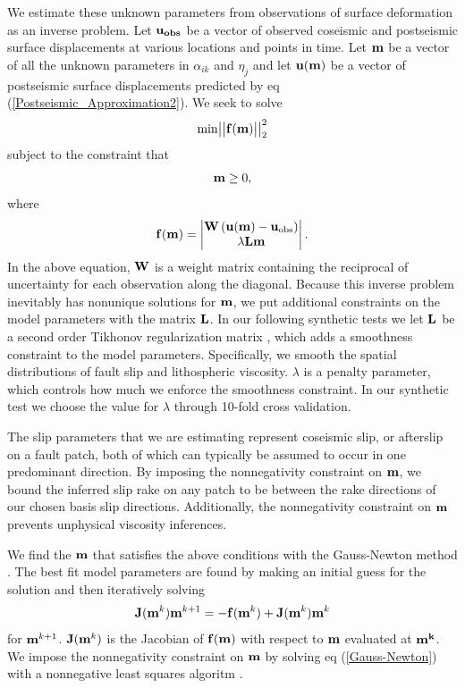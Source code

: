 \documentclass[12pt]{article}
\begin{document}
We estimate these unknown parameters from observations of surface
deformation as an inverse problem. Let $\bold{u_{obs}}$ be a vector
of observed coseismic and postseismic surface displacements at various
locations and points in time.  Let $\bold{m}$ be a vector of all the
unknown parameters in $\alpha_{ik}$ and $\eta_j$ and let $\bold{u(m)}$
be a vector of postseismic surface displacements predicted by eq
(\ref{Postseismic_Approximation2}). We seek to solve
\begin{equation}\label{Inverse_Problem}
  \mathrm{min}
  \big|\big|\bold{f(m)}\big|\big|_2^2
\end{equation}
subject to the constraint that
\begin{equation}
  \bold{m}\geq0,
\end{equation}
where 
\begin{equation}
  \bold{f(m)} = 
    \begin{vmatrix}
      \bold{W}\left(\bold{u(m)}-\bold{u}_{\mathrm{obs}}\right)\\
      \lambda\bold{Lm}\\
    \end{vmatrix} .
\end{equation}  
In the above equation, $\bold{W}$ is a weight matrix containing the
reciprocal of uncertainty for each observation along the diagonal. Because
this inverse problem inevitably has nonunique solutions for
$\bold{m}$, we put additional constraints on the model parameters with
the matrix $\bold{L}$.  In our following synthetic tests we let
$\bold{L}$ be a second order Tikhonov regularization matrix
\citep{TA1978}, which adds a smoothness constraint to the model
parameters.  Specifically, we smooth the spatial distributions of
fault slip and lithospheric viscosity.  $\lambda$ is a penalty
parameter, which controls how much we enforce the smoothness
constraint.  In our synthetic test we choose the value for
$\lambda$ through 10-fold cross validation.

The slip parameters that we are estimating represent coseismic
slip, or afterslip on a fault patch, both of which can typically be
assumed to occur in one predominant direction.  By imposing the
nonnegativity constraint on $\bold{m}$, we bound the inferred slip
rake on any patch to be between the rake directions of our chosen
basis slip directions.  Additionally, the nonnegativity constraint on
$\bold{m}$ prevents unphysical viscosity inferences.

We find the $\bold{m}$ that satisfies the above conditions with the
Gauss-Newton method \citep{A2013}.  The best fit model parameters are
found by making an initial guess for the solution and then iteratively
solving
\begin{equation}\label{Gauss-Newton}
\bold{J}(\bold{m}^{k})\bold{m}^{k+1} = -\bold{f}(\bold{m}^k) + \bold{J}(\bold{m}^{k})\bold{m}^{k}
\end{equation}
for $\bold{m}^{k+1}$.  $\bold{J}(\bold{m}^k)$ is the Jacobian of
$\bold{f(m)}$ with respect to $\bold{m}$ evaluated at $\bold{m^k}$. We
impose the nonnegativity constraint on $\bold{m}$ by solving eq
(\ref{Gauss-Newton}) with a nonnegative least squares algoritm
\cite{LH1974}.
\end{document}
